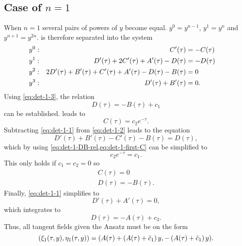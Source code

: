 \subsection{Case of \texorpdfstring{\(n=1\)}{n is 1}}

When \(n=1\) several pairs of powers of \(y\) become equal.
\(y^0 = y^{n-1}\), \(y^1 = y^n\) and \(y^{n+1} = y^{2n}\).
 is therefore separated into the system
\begin{subequations}
  \begin{flalign}
    y^0:  && C'(\tau) &= -C(\tau) &&\FlLabel{eq:det-1-0}\\
    y^1:  && D'(\tau) + 2C'(\tau) + A'(\tau) - D(\tau) &= -D(\tau) &&\FlLabel{eq:det-1-1}\\
    y^2:  && 2D'(\tau) + B'(\tau) + C'(\tau) + A'(\tau) - D(\tau) - B(\tau) &= 0 &&\FlLabel{eq:det-1-2}\\
    y^3:  && D'(\tau) + B'(\tau) &= 0. &&\FlLabel{eq:det-1-3}
  \end{flalign}
\end{subequations}
Using \cref{eq:det-1-3}, the relation
\begin{equation} \label{eq:det-1-DB-rel}
  D(\tau) = - B(\tau) + c_1
\end{equation}
can be established.
 leads to
\begin{equation} \label{eq:det-1-first-C}
  C(\tau) = c_2 e^{-\tau}.
\end{equation}
Subtracting \cref{eq:det-1-1} from \cref{eq:det-1-2} leads to the equation
\begin{equation}
  D'(\tau) + B'(\tau) - C'(\tau) - B(\tau) = D(\tau),
\end{equation}
which by using \cref{eq:det-1-DB-rel,eq:det-1-first-C} can be simplified to
\begin{equation}
  c_2 e^{-\tau} = c_1.
\end{equation}
This only holds if \(c_1 = c_2 = 0\) so
\begin{gather}
  C(\tau) = 0 \\
  D(\tau) = - B(\tau).
\end{gather}
Finally, \cref{eq:det-1-1} simplifies to
\begin{equation}
  D'(\tau) + A'(\tau) = 0,
\end{equation}
which integrates to
\begin{equation}
  D(\tau) = - A(\tau) + c_3.
\end{equation}
Thus, all tangent fields given the Ansatz must be on the form
\begin{equation} \label{eq:hill-tangent-field-1}
  \pqty{\xi_1(\tau,y),\eta_1(\tau,y)} = 
  \pqty{A(\tau) + \left( A(\tau) + \tilde{c}_1 \right) y, - \left( A(\tau) + \tilde{c}_1 \right) y}.
\end{equation}

